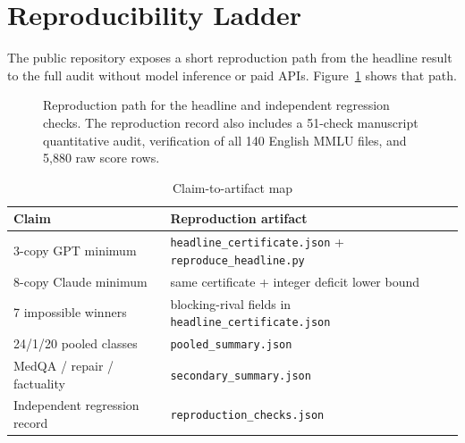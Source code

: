 \Needspace{0.42\textheight}
\section{Reproducibility Ladder}
The public repository exposes a short reproduction path from the headline result to the full audit without model inference or paid APIs. Figure~\ref{fig:repro} shows that path.

\begin{figure}[H]
\centering
{}
\caption{Reproduction path for the headline and independent regression checks. The reproduction record also includes a 51-check manuscript quantitative audit, verification of all 140 English MMLU files, and 5,880 raw score rows.}
\label{fig:repro}
\end{figure}

\begin{table}[H]
\caption{Claim-to-artifact map}
\label{tab:map}
\centering
\footnotesize
\begin{tabular}{p{}p{}}
\toprule
Claim & Reproduction artifact \\
\midrule
3-copy GPT minimum & \texttt{headline\_certificate.json} + \texttt{reproduce\_headline.py} \\
8-copy Claude minimum & same certificate + integer deficit lower bound \\
7 impossible winners & blocking-rival fields in \texttt{headline\_certificate.json} \\
24/1/20 pooled classes & \texttt{pooled\_summary.json} \\
MedQA / repair / factuality & \texttt{secondary\_summary.json} \\
Independent regression record & \texttt{reproduction\_checks.json} \\
\bottomrule
\end{tabular}
\end{table}

